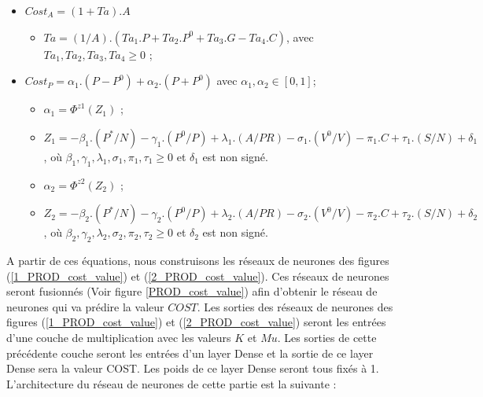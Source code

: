 \begin{itemize}[label=$\square$]
\item $Cost_A = (1 + Ta).A$
\begin{itemize}
	\item	$Ta = (1/A).(Ta_1.P + Ta_2.P^0 + Ta_3.G-Ta_4.C)$, avec $Ta_1, Ta_2, Ta_3, Ta_4 \geq 0$ ;
	
\end{itemize}
\item	$Cost_P = \alpha_1.(P - P^0) + \alpha_2.(P + P^0)$ avec $\alpha_1, \alpha_2 \in [0, 1]$; 
\begin{itemize}
\item	$\alpha_1 = \Phi^{z1}(Z_1)$ ;
\item	$Z_1 = -\beta_1.(P^*/N) -  \gamma_1.(P^0/P) + \lambda_1.(A/PR) -  \sigma_1.(V^0/V) -\pi_1.C +\tau_1. (S/N)+ \delta_1$ , où $\beta_1, \gamma_1, \lambda_1, \sigma_1, \pi_1, \tau_1 \geq 0$ et $\delta_1$ est non signé.
\item	$\alpha_2 = \Phi^{z2}(Z_2)$ ;
\item	$Z_2 = -\beta_2.(P^*/N) -  \gamma_2.(P^0/P) + \lambda_2.(A/PR) -  \sigma_2.(V^0/V) -\pi_2.C +\tau_2. (S/N)+ \delta_2$ , où $\beta_2, \gamma_2, \lambda_2, \sigma_2, \pi_2, \tau_2 \geq 0$ et $\delta_2$ est non signé.

\end{itemize}
\end{itemize}

A partir de ces équations, nous construisons les réseaux de neurones des figures (\ref{1_PROD_cost_value}) et (\ref{2_PROD_cost_value}). Ces réseaux de neurones seront fusionnés (Voir figure \ref{PROD_cost_value}) afin d'obtenir le réseau de neurones qui va prédire la valeur $COST$. Les sorties des réseaux de neurones des figures (\ref{1_PROD_cost_value}) et (\ref{2_PROD_cost_value}) seront les entrées d'une couche de multiplication avec les valeurs $K$ et $Mu$. Les sorties de cette précédente couche seront les entrées d'un layer Dense et la sortie de ce layer Dense sera la valeur COST. Les poids de ce layer Dense seront tous fixés à 1.
L'architecture du réseau de neurones de cette partie est la suivante : 

